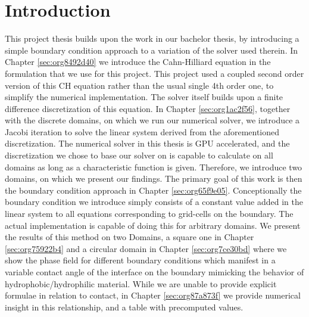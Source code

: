 \documentclass{mimosis}
\begin{document}
\chapter{Introduction}
\label{sec:org172b883}
This project thesis builds upon the work in our bachelor thesis, by introducing a simple boundary condition approach to a variation of the solver used therein. In Chapter \ref{sec:org8492d40} we introduce the Cahn-Hilliard equation in the formulation that we use for this project. This project used a coupled second order version of this CH equation rather than the usual single 4th order one, to simplify the numerical implementation. The solver itself builds upon a finite difference discretization of this equation. In Chapter \ref{sec:org1ac2f56}, together with the discrete domains, on which we run our numerical solver, we introduce a Jacobi iteration to solve the linear system derived from the aforementioned discretization.  The numerical solver in this thesis is GPU accelerated, and the discretization we chose to base our solver on is capable to calculate on all domains as long as a characteristic function is given. Therefore, we introduce two domains, on which we present our findings. The primary goal of this work is then the boundary condition approach in Chapter \ref{sec:org65f9e05}. Conceptionally the boundary condition we introduce simply consists of a constant value added in the linear system to all equations corresponding to grid-cells on the boundary. The actual implementation is capable of doing this for arbitrary domains. We present the results of this method on two Domains, a square one in Chapter \ref{sec:org75922b4} and a circular domain in Chapter \ref{sec:org7ce30bd} where we show the phase field for different boundary conditions which manifest in a variable contact angle of the interface on the boundary mimicking the behavior of hydrophobic/hydrophilic material. While we are unable to provide explicit formulae in relation to contact, in Chapter \ref{sec:org87a873f} we provide numerical insight in this relationship, and a table with precomputed values.
\end{document}
